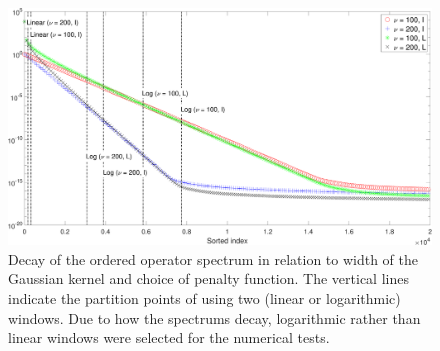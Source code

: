 \documentclass[12pt]{article}
\begin{document}
\begin{figure}[ht]
\includegraphics[width=1.0\textwidth]{Figures/SpectrumDecay.pdf}
\caption{Decay of the ordered operator spectrum in relation to width of the Gaussian kernel and choice of penalty function. The vertical lines indicate the partition points of using two (linear or logarithmic) windows. Due to how the spectrums decay, logarithmic rather than linear windows were selected for the numerical tests.}
\label{fig:Spectral Decay}
\end{figure}
\end{document}
